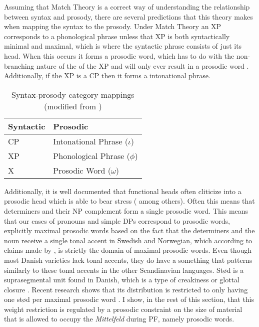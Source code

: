 \documentclass[12pt, letterpaper]{article}
\begin{document}
Assuming that Match Theory \citep{selkirkClauseIntonationalPhrase2009,selkirkSyntaxPhonologyInterface2011} is a correct way of understanding the relationship between syntax and prosody, there are several predictions that this theory makes when mapping the syntax to the prosody. Under Match Theory an XP corresponds to a phonological phrase unless that XP is both syntactically minimal and maximal, which is where the syntactic phrase consists of just its head. When this occurs it forms a prosodic word, which has to do with the non-branching nature of the of the XP and will only ever result in a prosodic word  \citep{bennettLightestRightApparently2016}. Additionally, if the XP is a CP then it forms a intonational phrase.
\begin{table}[!h]
\caption{Syntax-prosody category mappings (modified from \cite{tylerSimplifyingMATCHWORD2019})}
\label{tab:Mappings}
\centering
\begin{tabular}{ll}
\hline
\textbf{Syntactic}&\textbf{Prosodic}\\
\hline
CP & Intonational Phrase ($\iota$)\\
XP & Phonological Phrase ($\phi$) \\
X & Prosodic Word ($\omega$)\\
\hline
\end{tabular}
\end{table}  

Additionally, it is well documented that functional heads often cliticize into a prosodic head which is able to bear stress (\cite{zwickyClitics1977,selkirkProsodicStructureIts1981,zwickyCliticizationVsInflection1983,inkelasProsodicConstituencyLexicon1990} among others). 
Often this means that determiners and their NP complement form a single prosodic word. 
This means that our cases of pronouns and simple DPs correspond to prosodic words, explicitly maximal prosodic words based on the fact that the determiners and the noun receive a single tonal accent in Swedish and Norwegian, which according to claims made by \citet{myrbergProsodicWordSwedish2013,myrbergProsodicHierarchySwedish2015,riadPhonologySwedish2014}, is strictly the domain of maximal prosodic words. 
Even though most Danish varieties lack tonal accents, they do have a something that patterns similarly to these tonal accents in the other Scandinavian languages. 
Stød is a suprasegmental unit found in Danish, which is a type of creakiness or glottal closure \citep{basbollPhonologyDanish2005}. 
Recent research shows that its distribution is restricted to only having one stød per maximal prosodic word \citep{kalivodaProsodicRecursionPseudocyclicity2018}. 
I show, in the rest of this section, that this weight restriction is regulated by a prosodic constraint on the size of material that is allowed to occupy the \emph{Mittelfeld} during PF, namely prosodic words. 
\end{document}

